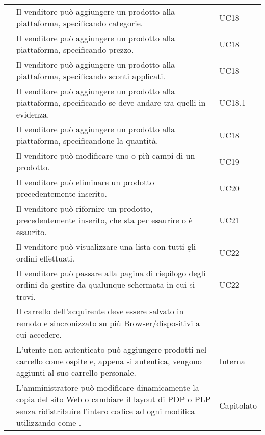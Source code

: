 \begin{longtable}{|c C{9.5cm} C{2.5cm}|}
     & Il venditore può aggiungere un prodotto alla piattaforma, specificando categorie. & UC18 \\
    
     & Il venditore può aggiungere un prodotto alla piattaforma, specificando prezzo. & UC18 \\
    
     & Il venditore può aggiungere un prodotto alla piattaforma, specificando sconti applicati. & UC18 \\
    
     & Il venditore può aggiungere un prodotto alla piattaforma, specificando se deve andare tra quelli in evidenza. & UC18.1 \\
    
     & Il venditore può aggiungere un prodotto alla piattaforma, specificandone la quantità. & UC18 \\
    
     & Il venditore può modificare uno o più campi di un prodotto. & UC19 \\
    
     & Il venditore può eliminare un prodotto precedentemente inserito. & UC20 \\
    
     & Il venditore può rifornire un prodotto, precedentemente inserito, che sta per esaurire o è esaurito. & UC21 \\
    
     & Il venditore può visualizzare una lista con tutti gli ordini effettuati. & UC22 \\
    
     & Il venditore può passare alla pagina di riepilogo degli ordini da gestire da qualunque schermata in cui si trovi. & UC22 \\
    
     & Il carrello dell'acquirente deve essere salvato in remoto e sincronizzato su più Browser/dispositivi a cui accedere. &  \\
    
     & L'utente non autenticato può aggiungere prodotti nel carrello come ospite e, appena si autentica, vengono aggiunti al suo carrello personale. & Interna \\
    
     & L'amministratore può modificare dinamicamente la copia del sito Web o cambiare il layout di PDP o PLP senza ridistribuire l'intero codice ad ogni modifica utilizzando  come . & Capitolato \\

\end{longtable}
